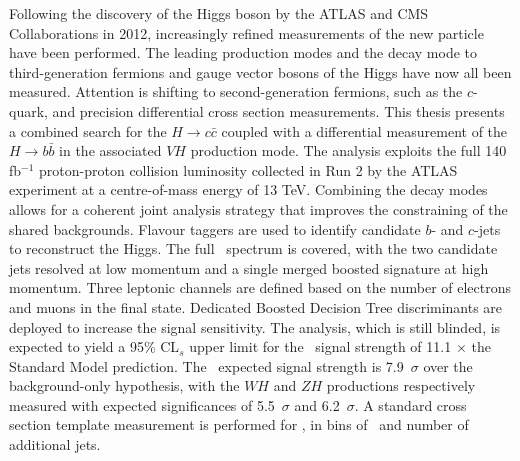 Following the discovery of the Higgs boson by the ATLAS and CMS Collaborations in 2012, increasingly refined measurements of the new particle have been performed. The leading production modes and the decay mode to third-generation fermions and gauge vector bosons of the Higgs have now all been measured. Attention is shifting to second-generation fermions, such as the $c$-quark, and precision differential cross section measurements. This thesis presents a combined search for the $H \rightarrow c\bar{c}$ coupled with a differential measurement of the $H \rightarrow b\bar{b}$ in the associated $VH$ production mode. The analysis exploits the full 140 fb$^{-1}$ proton-proton collision luminosity collected in Run 2 by the ATLAS experiment at a centre-of-mass energy of 13 TeV. Combining the decay modes allows for a coherent joint analysis strategy that improves the constraining of the shared backgrounds. Flavour taggers are used to identify candidate $b$- and $c$-jets to reconstruct the Higgs. The full \pt\ spectrum is covered, with the two candidate jets resolved at low momentum and a single merged boosted signature at high momentum. Three leptonic channels are defined based on the number of electrons and muons in the final state. Dedicated Boosted Decision Tree discriminants are deployed to increase the signal sensitivity. The analysis, which is still blinded, is expected to yield a 95\% CL$_s$ upper limit for the \vhc\ signal strength of 11.1 $\times$ the Standard Model prediction. The \vhb\ expected signal strength is 7.9~$\sigma$ over the background-only hypothesis, with the $WH$ and $ZH$ productions respectively measured with expected significances of 5.5~$\sigma$ and 6.2~$\sigma$. A standard cross section template measurement is performed for \vhb, in bins of \pt\ and number of additional jets.
\vspace*{\fill}
    